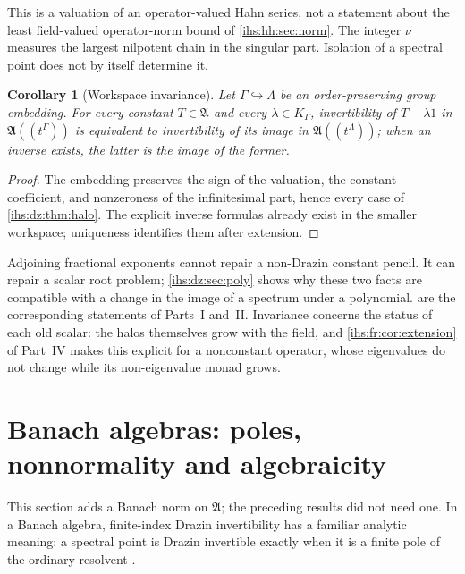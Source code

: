 \documentclass[11pt,a4paper]{article}
\numberwithin{equation}{section}
\newtheorem{corollary}[corollary]{Corollary}
\theoremstyle{definition}
\theoremstyle{remark}
\newcommand{\Alg}{\mathfrak A}
\begin{document}
This is a valuation of an operator-valued Hahn series, not a statement about
the least field-valued operator-norm bound of \cref{ihs:hh:sec:norm}. The
integer $\nu$ measures the largest nilpotent chain in the singular part.
Isolation of a spectral point does not by itself determine it.

\begin{corollary}[Workspace invariance]\label{ihs:dz:cor:workspace}
Let $\Gamma\hookrightarrow\Lambda$ be an order-preserving group embedding.
For every constant $T\in\Alg$ and every $\lambda\in K_\Gamma$, invertibility of
$T-\lambda1$ in $\Alg((t^\Gamma))$ is equivalent to invertibility of its
image in $\Alg((t^\Lambda))$; when an inverse exists, the latter is the image
of the former.
\end{corollary}
\begin{proof}
The embedding preserves the sign of the valuation, the constant coefficient,
and nonzeroness of the infinitesimal part, hence every case of
\cref{ihs:dz:thm:halo}. The explicit inverse formulas already exist in the
smaller workspace; uniqueness identifies them after extension.
\end{proof}

Adjoining fractional exponents cannot repair a non-Drazin constant pencil. It
can repair a scalar root problem; \cref{ihs:dz:sec:poly} shows why these two
facts are compatible with a change in the image of a spectrum under a
polynomial.  are the
corresponding statements of Parts~I and~II. Invariance concerns the status
of each old scalar: the halos themselves grow with the field, and
\cref{ihs:fr:cor:extension} of Part~IV makes this explicit for a nonconstant
operator, whose eigenvalues do not change while its non-eigenvalue monad
grows.

\section{Banach algebras: poles, nonnormality and algebraicity}\label{ihs:dz:sec:banach}

This section adds a Banach norm on $\Alg$; the preceding results did not
need one. In a Banach algebra, finite-index Drazin invertibility has a
familiar analytic meaning: a spectral point is Drazin invertible exactly when
it is a finite pole of the ordinary resolvent \cite{BoassoOperators,Boasso}.
\end{document}

